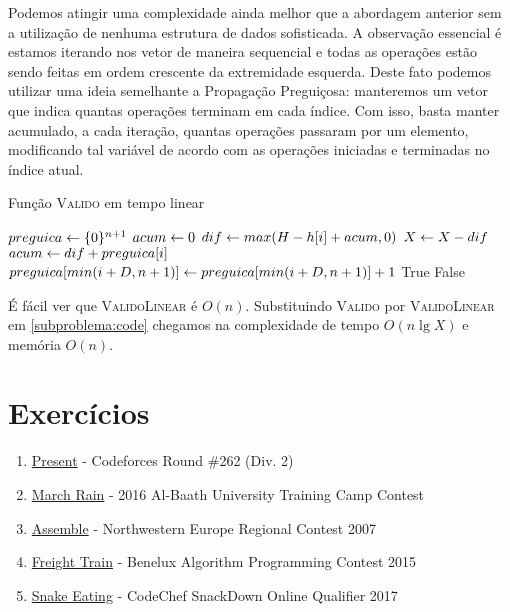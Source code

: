 Podemos atingir uma complexidade ainda melhor que a abordagem anterior sem a utilização de nenhuma estrutura de dados sofisticada. A observação essencial é estamos iterando nos vetor de maneira sequencial e todas as operações estão sendo feitas em ordem crescente da extremidade esquerda. Deste fato podemos utilizar uma ideia semelhante a Propagação Preguiçosa: manteremos um vetor que indica quantas operações terminam em cada índice. Com isso, basta manter acumulado, a cada iteração, quantas operações passaram por um elemento, modificando tal variável de acordo com as operações iniciadas e terminadas no índice atual.

\begin{algorithm}[H]
\caption{Função \textsc{Valido} em tempo linear}
\label{subproblema:code_linear}
\begin{algorithmic}[1]
    \State $preguica \leftarrow \{0\}^{n + 1}$
    \State $acum \leftarrow 0$
        \State $dif \leftarrow max(H - h[i] + acum, 0)$
        \State $X \leftarrow X - dif$
        \State $acum \leftarrow dif + preguica[i]$
        \State $preguica[min(i + D, n + 1)] \leftarrow preguica[min(i + D, n + 1)] + 1$
    \EndFor
        \State \Return True
    \Else
        \State \Return False
    \EndIf
\EndFunction
\end{algorithmic}
\end{algorithm}

É fácil ver que \textsc{ValidoLinear} é $O(n)$. Substituindo \textsc{Valido} por \textsc{ValidoLinear} em \ref{subproblema:code} chegamos na complexidade de tempo $O(n \lg X)$ e memória $O(n)$.

\section{Exercícios}

\begin{enumerate}
  \item \href{https://codeforces.com/problemset/problem/460/C}{Present} - Codeforces Round \#262 (Div. 2)
  \item \href{https://codeforces.com/problemset/gymProblem/101028/I}{March Rain} - 2016 Al-Baath University Training Camp Contest
  \item \href{https://icpcarchive.ecs.baylor.edu/index.php?option=com_onlinejudge&Itemid=8&page=show_problem&problem=1972}{Assemble} - Northwestern Europe Regional Contest 2007
  \item \href{https://open.kattis.com/problems/freighttrain}{Freight Train} - Benelux Algorithm Programming Contest 2015
  \item \href{https://www.codechef.com/problems/SNAKEEAT}{Snake Eating} - CodeChef SnackDown Online Qualifier 2017
\end{enumerate}
